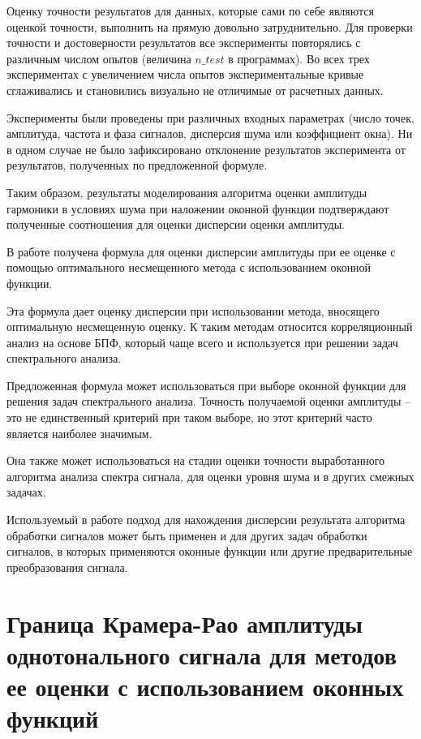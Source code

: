 Оценку точности результатов для данных, которые сами по себе являются оценкой точности, выполнить на прямую довольно затруднительно. Для проверки точности и достоверности результатов все эксперименты повторялись с различным числом опытов (величина $n\_test$ в программах). Во всех трех экспериментах с увеличением числа опытов экспериментальные кривые сглаживались и становились визуально не отличимые от расчетных данных.

Эксперименты были проведены при различных входных параметрах (число точек, амплитуда, частота и фаза сигналов, дисперсия шума или коэффициент окна). Ни в одном случае не было зафиксировано отклонение результатов эксперимента от результатов, полученных по предложенной формуле.

Таким образом, результаты моделирования алгоритма оценки амплитуды гармоники в условиях шума при наложении оконной функции подтверждают полученные соотношения для оценки дисперсии оценки амплитуды.

В работе получена формула для оценки дисперсии амплитуды при ее оценке с помощью оптимального несмещенного метода с использованием оконной функции.

Эта формула дает оценку дисперсии при использовании метода, вносящего оптимальную несмещенную оценку. К таким методам относится корреляционный анализ на основе БПФ, который чаще всего и используется при решении задач спектрального анализа.

Предложенная формула может использоваться при выборе оконной функции для решения задач спектрального анализа. Точность получаемой оценки амплитуды – это не единственный критерий при таком выборе, но этот критерий часто является наиболее значимым.

Она также может использоваться на стадии оценки точности выработанного алгоритма анализа спектра сигнала, для оценки уровня шума и в других смежных задачах.

Используемый в работе подход для нахождения дисперсии результата алгоритма обработки сигналов может быть применен и для других задач обработки сигналов, в которых применяются оконные функции или другие предварительные преобразования сигнала.

\section{Граница Крамера-Рао амплитуды однотонального сигнала для методов ее оценки с использованием оконных функций} \label{sec:ch2/sec4} %

